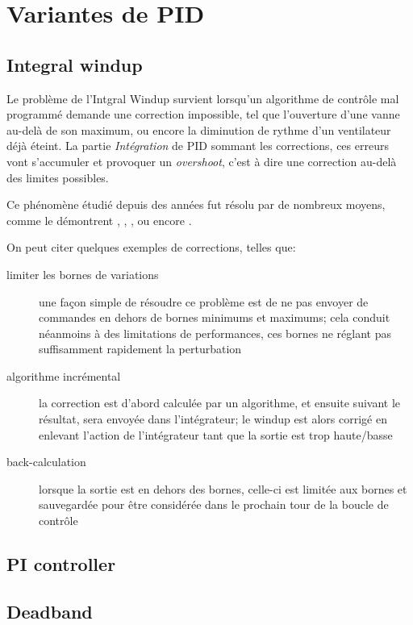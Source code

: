 \section{Variantes de PID}

\subsection{Integral windup}
Le problème de l'Intgral Windup survient lorsqu'un algorithme de contrôle mal programmé demande une correction impossible, tel que l'ouverture d'une vanne au-delà de son maximum, ou encore la diminution de rythme d'un ventilateur déjà éteint. La partie \emph{Intégration} de PID sommant les corrections, ces erreurs vont s'accumuler et provoquer un \emph{overshoot}, c'est à dire une correction au-delà des limites possibles.

Ce phénomène étudié depuis des années fut résolu par de nombreux moyens, comme le démontrent \cite{ControlGuruIntegralWindup}, \cite{astrom1995pid}, \cite{shin2012anti}, ou encore \cite{bohn1995analysis}.

On peut citer quelques exemples de corrections, telles que:
\begin{description}
\item[limiter les bornes de variations] une façon simple de résoudre ce problème est de ne pas envoyer de commandes en dehors de bornes minimums et maximums; cela conduit néanmoins à des limitations de performances, ces bornes ne réglant pas suffisamment rapidement la perturbation
\item[algorithme incrémental] la correction est d'abord calculée par un algorithme, et ensuite suivant le résultat, sera envoyée dans l'intégrateur; le windup est alors corrigé en enlevant l'action de l'intégrateur tant que la sortie est trop haute/basse
\item[back-calculation] lorsque la sortie est en dehors des bornes, celle-ci est limitée aux bornes et sauvegardée pour être considérée dans le prochain tour de la boucle de contrôle
\end{description}

\subsection{PI controller}

\subsection{Deadband}

